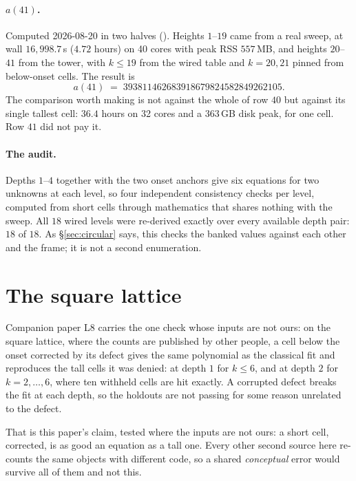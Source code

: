 \documentclass[11pt]{article}
\begin{document}
\paragraph{$a(41)$.} Computed 2026-08-20 in two halves
(). Heights $1$--$19$ came from a real sweep, at
wall $16{,}998.7$\,s ($4.72$ hours) on 40 cores with peak RSS $557$\,MB, and
heights $20$--$41$ from the tower, with $k \le 19$ from the wired table and $k = 20, 21$
pinned from below-onset cells. The result is
\[
  a(41) \;=\; 393811462683918679824582849262105 .
\]
The comparison worth making is not against the whole of row $40$ but against its
single tallest cell: $36.4$ hours on 32 cores and a $363$\,GB disk peak, for one
cell. Row $41$ did not pay it.

\paragraph{The audit.} Depths $1$--$4$ together with the two onset anchors give
six equations for two unknowns at each level, so four independent consistency
checks per level, computed from short cells through mathematics that shares
nothing with the sweep. All $18$ wired levels were re-derived exactly over every
available depth pair: $18$ of $18$. As \S\ref{sec:circular} says, this checks
the banked values against each other and the frame; it is not a second
enumeration.

\section{The square lattice}\label{sec:square}

Companion paper L8 carries the one check whose inputs are not ours: on the
square lattice, where the counts are
published by other people, a cell below the onset corrected by its defect gives
the same polynomial as the classical fit and reproduces the tall cells it was
denied: at depth $1$ for $k \le 6$, and at depth $2$ for $k = 2,\dots,6$, where
ten withheld cells are hit exactly. A corrupted defect breaks the fit at
each depth, so the holdouts are not passing for some reason unrelated to the
defect.

That is this paper's claim, tested where the inputs are not ours: a short cell,
corrected, is as good an equation as a tall one. Every other second source here
re-counts the same objects with different code, so a shared \emph{conceptual}
error would survive all of them and not this.
\end{document}
